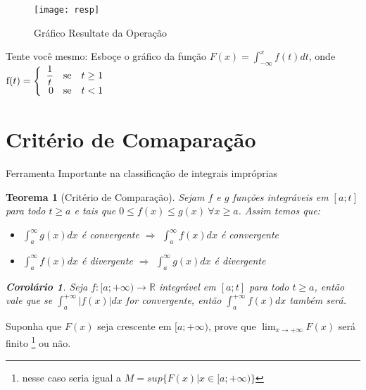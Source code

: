 \documentclass[12pt,openany]{book}
\newtheorem{theorem}{Teorema}[section]
\newtheorem{corollary}{Corolário}[theorem]
\begin{document}
\begin{figure}[ht]
\centering
\texttt{[image: resp]}
\caption{Gráfico Resultate da Operação}
\label{fig:res1}
\end{figure}
\vspace{20pt}

\hspace{5mm}Tente você mesmo: Esboçe o gráfico da função $\displaystyle{F(x) = \int_{-\infty}^x f(t)dt}$, onde $\hbox{f}(t)
= \left\{ \begin{array}{rll}
\displaystyle{\frac{1}{t}} & \hbox{se} &  t \geq 1 \\
0 & \hbox{se} &  t < 1 \\
\end{array}\right.$

\section{Critério de Comaparação}
\label{sec:13}

\hspace{5mm} Ferramenta Importante na classificação de integrais impróprias

\begin{theorem}[Critério de Comparação]
Sejam $f$ e $g$ funções integráveis em $[a;t]$ para todo $t\geq a$ e tais que $0\leq f(x)\leq g(x)\ \forall x \geq a$.  Assim temos que:
\begin{itemize}
\item $\displaystyle{\int_a^{\infty} g(x)dx}$ é convergente $\Rightarrow$ $\displaystyle{\int_a^{\infty} f(x)dx}$ é convergente
\item $\displaystyle{\int_a^{\infty} f(x)dx}$ é divergente $\Rightarrow$ $\displaystyle{\int_a^{\infty} g(x)dx}$ é divergente
\end{itemize}
\vspace{10pt}
\begin{corollary}
Seja $f:[a;+\infty) \rightarrow \mathds{R}$ integrável em $[a;t]$ para todo $t \geq a$, então vale que se $\displaystyle{\int_a^{+\infty}|f(x)| dx}$ for convergente, então $\displaystyle{\int_a^{+\infty} f(x) dx}$ também será.
\end{corollary}
\end{theorem}
\vspace{10pt}

Suponha que $F(x)$ seja crescente em $[a;+\infty)$, prove que $\displaystyle{\lim_{x \rightarrow +\infty} F(x) }$ será finito \footnote{nesse caso seria igual a $M = sup\{F(x)| x \in [a;+\infty)\}$ } ou não.
\end{document}
